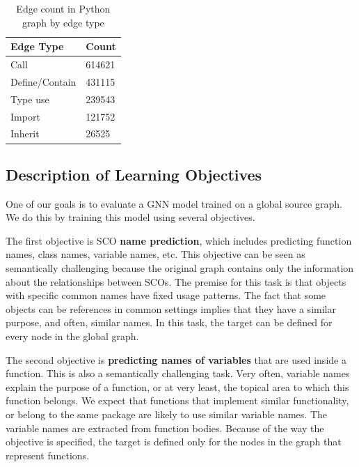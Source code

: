 \documentclass[a4paper,twoside]{article}
\begin{document}
\begin{table}[]
\centering
\begin{tabular}{ll}
\toprule
\textbf{Edge Type}       & \textbf{Count} \\ \midrule
Call            & 614621 \\ \midrule
Define/Contain  & 431115 \\ \midrule
Type use        & 239543 \\ \midrule
Import          & 121752 \\ \midrule
Inherit         & 26525 \\ \bottomrule
\end{tabular}
\caption{Edge count in Python graph by edge type\label{tbl:python_edge_count}}
\end{table}

\subsection{Description of Learning Objectives}

One of our goals is to evaluate a GNN model trained on a global source graph. We do this by training this model using several objectives.

The first objective is SCO \textbf{name prediction}, which includes predicting function names, class names, variable names, etc. This objective can be seen as semantically challenging because the original graph contains only the information about the relationships between SCOs. The premise for this task is that objects with specific common names have fixed usage patterns. The fact that some objects can be references in common settings implies that they have a similar purpose, and often, similar names. In this task, the target can be defined for every node in the global graph.

The second objective is \textbf{predicting names of variables} that are used inside a function. This is also a semantically challenging task. Very often, variable names explain the purpose of a function, or at very least, the topical area to which this function belongs. We expect that functions that implement similar functionality, or belong to the same package are likely to use similar variable names. The variable names are extracted from function bodies. Because of the way the objective is specified, the target is defined only for the nodes in the graph that represent functions.  
\end{document}
